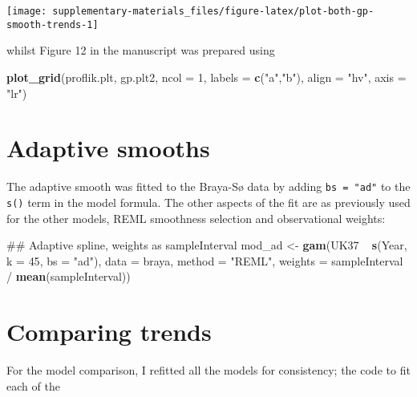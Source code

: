 \documentclass[12pt,]{article}
\newenvironment{Shaded}{\begin{snugshade}}{\end{snugshade}}
\newcommand{\KeywordTok}[1]{\textcolor[rgb]{0.13,0.29,0.53}{\textbf{{#1}}}}
\newcommand{\DataTypeTok}[1]{\textcolor[rgb]{0.13,0.29,0.53}{{#1}}}
\newcommand{\DecValTok}[1]{\textcolor[rgb]{0.00,0.00,0.81}{{#1}}}
\newcommand{\StringTok}[1]{\textcolor[rgb]{0.31,0.60,0.02}{{#1}}}
\newcommand{\NormalTok}[1]{{#1}}
\begin{document}
\begin{center}\texttt{[image: supplementary-materials\_files/figure-latex/plot-both-gp-smooth-trends-1]} \end{center}

whilst Figure 12 in the manuscript was prepared using

\begin{Shaded}
\begin{Highlighting}[]
\KeywordTok{plot_grid}\NormalTok{(proflik.plt, gp.plt2, }\DataTypeTok{ncol =} \DecValTok{1}\NormalTok{, }\DataTypeTok{labels =} \KeywordTok{c}\NormalTok{(}\StringTok{"a"}\NormalTok{,}\StringTok{"b"}\NormalTok{),}
          \DataTypeTok{align =} \StringTok{"hv"}\NormalTok{, }\DataTypeTok{axis =} \StringTok{"lr"}\NormalTok{)}
\end{Highlighting}
\end{Shaded}

\section{Adaptive smooths}\label{adaptive-smooths}

The adaptive smooth was fitted to the Braya-Sø data by adding
\texttt{bs\ =\ "ad"} to the \texttt{s()} term in the model formula. The
other aspects of the fit are as previously used for the other models,
REML smoothness selection and observational weights:

\begin{Shaded}
\begin{Highlighting}[]
\NormalTok{## Adaptive spline, weights as sampleInterval}
\NormalTok{mod_ad <-}\StringTok{ }\KeywordTok{gam}\NormalTok{(UK37 ~}\StringTok{ }\KeywordTok{s}\NormalTok{(Year, }\DataTypeTok{k =} \DecValTok{45}\NormalTok{, }\DataTypeTok{bs =} \StringTok{"ad"}\NormalTok{), }\DataTypeTok{data =} \NormalTok{braya,}
              \DataTypeTok{method =} \StringTok{"REML"}\NormalTok{,}
              \DataTypeTok{weights =} \NormalTok{sampleInterval /}\StringTok{ }\KeywordTok{mean}\NormalTok{(sampleInterval))}
\end{Highlighting}
\end{Shaded}

\section{Comparing trends}\label{comparing-trends}

For the model comparison, I refitted all the models for consistency; the
code to fit each of the
\end{document}
